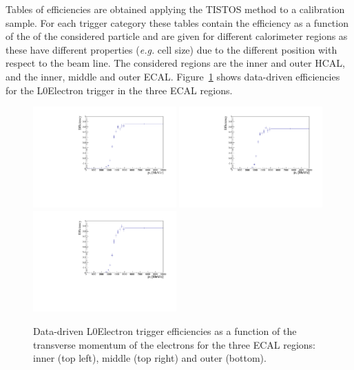 Tables of efficiencies are obtained applying the TISTOS method to a calibration sample.
For each trigger category these tables contain the efficiency as a function of
the \pt of the considered particle and are given for different calorimeter regions
as these have different properties (\emph{e.g.} cell size) due to the different position
with respect to the beam line. The considered regions are the inner and outer HCAL, 
and the inner, middle and outer ECAL. Figure~\ref{sec:L0eff_tables} shows data-driven 
efficiencies for the L0Electron trigger in the three ECAL regions.
%
\begin{figure}[h!]
\centering
\includegraphics[width=0.49\textwidth]{RKst/figs/l0plots/l0E_Inner.pdf}
\includegraphics[width=0.49\textwidth]{RKst/figs/l0plots/l0E_Middle.pdf}
\includegraphics[width=0.49\textwidth]{RKst/figs/l0plots/l0E_Outer.pdf}
\caption{Data-driven L0Electron trigger efficiencies as a function of the transverse momentum
of the electrons for the three ECAL regions: inner (top left), middle (top right) and outer (bottom).}
\label{sec:L0eff_tables}
\end{figure}

